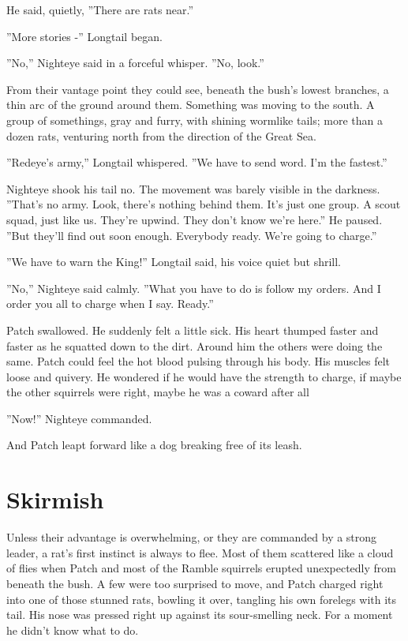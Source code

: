 \documentclass[12pt]{book}
\begin{document}
He said, quietly, ''There are rats near.''

''More stories -'' Longtail began.

''No,'' Nighteye said in a forceful whisper. ''No, look.''

From their vantage point they could see, beneath the bush's lowest branches, a thin arc of the ground around them. Something was moving to the south. A group of somethings, gray and furry, with shining wormlike tails; more than a dozen rats, venturing north from the direction of the Great Sea.

''Redeye's army,'' Longtail whispered. ''We have to send word. I'm the fastest.''

Nighteye shook his tail no. The movement was barely visible in the darkness. ''That's no army. Look, there's nothing behind them. It's just one group. A scout squad, just like us. They're upwind. They don't know we're here.'' He paused. ''But they'll find out soon enough. Everybody ready. We're going to charge.''

''We have to warn the King!'' Longtail said, his voice quiet but shrill.

''No,'' Nighteye said calmly. ''What you have to do is follow my orders. And I order you all to charge when I say. Ready.''

Patch swallowed. He suddenly felt a little sick. His heart thumped faster and faster as he squatted down to the dirt. Around him the others were doing the same. Patch could feel the hot blood pulsing through his body. His muscles felt loose and quivery. He wondered if he would have the strength to charge, if maybe the other squirrels were right, maybe he was a coward after all %

''Now!'' Nighteye commanded.

And Patch leapt forward like a dog breaking free of its leash.


\section{Skirmish}

Unless their advantage is overwhelming, or they are commanded by a strong leader, a rat's first instinct is always to flee. Most of them scattered like a cloud of flies when Patch and most of the Ramble squirrels erupted unexpectedly from beneath the bush. A few were too surprised to move, and Patch charged right into one of those stunned rats, bowling it over, tangling his own forelegs with its tail. His nose was pressed right up against its sour-smelling neck. For a moment he didn't know what to do.
\end{document}
